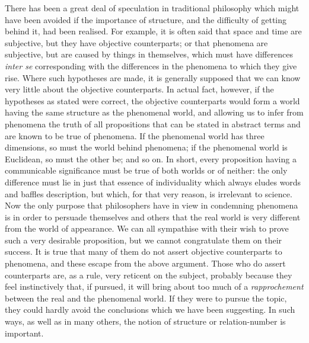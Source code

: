 {There has been a great deal of speculation in
traditional
philosophy
which might have been avoided if the importance of structure, and the
difficulty of getting behind it, had been realised. For example, it is
often said that space and time are
subjective, but
they have objective counterparts; or that phenomena are subjective, but
are caused by things in themselves, which must have differences \textit{inter
se} corresponding with the differences in the phenomena to
which they
give rise. Where such hypotheses are made, it is generally supposed
that we can know very little about the objective counterparts. In
actual fact, however, if the hypotheses as stated were correct, the
objective counterparts would form a world having the same structure as
the phenomenal world, and allowing us to infer from phenomena the truth
of all propositions that can be stated in abstract terms and are known
to be true of phenomena. If the phenomenal world has three dimensions,
so must the world behind phenomena; if the phenomenal world is
Euclidean, so must the other be; and so on. In short, every proposition
having a communicable
significance
must be
true of both worlds or of neither: the only difference must lie in just
that essence of individuality which always eludes words and baffles
description, but which, for that very reason, is irrelevant to science.
Now the only purpose that philosophers \protect{} have in view in condemning
phenomena is in order to persuade themselves and others that the real
world is very different from the world of appearance. We can all
sympathise with their wish to prove such a very desirable proposition,
but we cannot congratulate them on their success. It is true that many
of them do not assert objective counterparts to phenomena, and these
escape from the above argument. Those who do assert counterparts are,
as a rule, very reticent on the subject, probably because they feel
instinctively that, if pursued, it will bring about too much of a
\textit{rapprochement}
between the real and the phenomenal world. If they were
to pursue the topic, they could hardly avoid the conclusions which we
have been suggesting. In such ways, as well as in many others, the
notion of structure or relation-number is important.}
